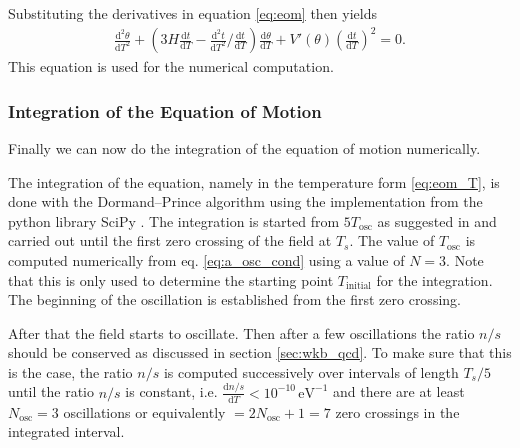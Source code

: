 \documentclass[twoside,a4paper, 12pt]{article}
\newcommand{\diff}{\mathrm{d}}
\numberwithin{equation}{section}
\begin{document}
Substituting the derivatives in equation \eqref{eq:eom} then yields  \cite[Section S11]{LatticQCD4Cosmo}
\begin{align}
    \label{eq:eom_T}
    \frac{\diff^2 \theta}{\diff T^2} +
                 \left(
                 3H \frac{\diff t}{\diff T}
                 - \frac{\diff^2 t}{\diff T^2} / \frac{\diff t}{\diff T}
                 \right) \frac{\diff \theta}{\diff T} +
                 V'(\theta) \left( \frac{\diff t}{\diff T} \right)^2 = 0.
\end{align}
This equation is used for the numerical computation.

\subsubsection{Integration of the Equation of Motion}
Finally we can now do the integration of the equation of motion numerically.

\noindent
The integration of the equation, namely in the temperature
form \eqref{eq:eom_T}, is done with
the Dormand–Prince algorithm using the
implementation from the python library SciPy \cite{scipy}.
The integration is started from $5 T_\mathrm{osc}$ as suggested
in \cite[Sec. S11]{LatticQCD4Cosmo} and carried out until the first zero
crossing of the field at $T_s$.
The value of $T_\mathrm{osc}$ is computed numerically from eq. \eqref{eq:a_osc_cond} using a value of $N = 3$.
Note that this is only used to determine the starting point $T_\mathrm{initial}$ for the integration.
The beginning of the oscillation is established from the first zero crossing.

\noindent
After that the field starts to oscillate.
Then after a few oscillations the ratio $n / s$ should be conserved as discussed in section \ref{sec:wkb_qcd}.
To make sure that this is the case, the ratio $n / s$ is computed successively over intervals of length $T_s / 5$
until the ratio $n / s$ is constant, i.e. $\frac{\diff n / s}{\diff T} < 10^{-10} \, \mathrm{eV}^{-1}$ and
there are at least $N_\mathrm{osc} = 3$ oscillations or equivalently $= 2 N_\mathrm{osc} + 1 = 7$ zero crossings in the integrated interval.
\end{document}
